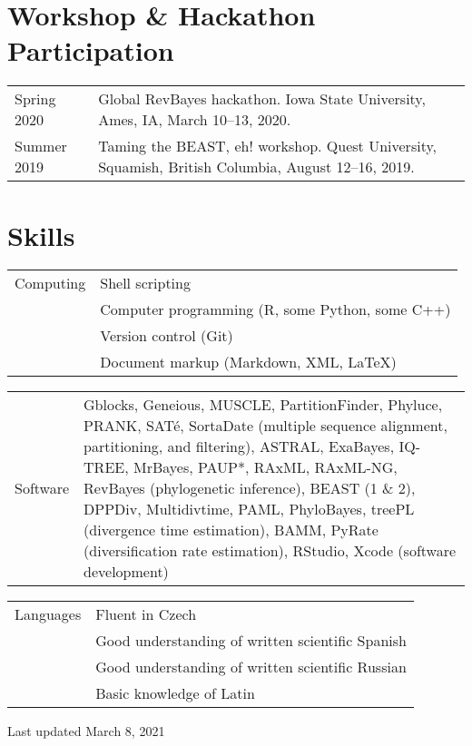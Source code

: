 \documentclass[10pt]{article}
\begin{document}
\section*{Workshop \& Hackathon Participation}

\begin{tabularx}{\textwidth}{>{\raggedleft\arraybackslash}p{2.2cm} X}
Spring 2020 & Global \textsf{RevBayes} hackathon. Iowa State University, Ames, IA, March 10--13, 2020. \\[0.1cm]
Summer 2019 & Taming the BEAST, eh! workshop. Quest University, Squamish, British Columbia, August 12--16, 2019.
\end{tabularx}

\section*{Skills}

\begin{tabularx}{\textwidth}{>{\raggedleft\arraybackslash}p{2.2cm} X}
Computing & Shell scripting \\
& Computer programming (\textsf{R}, some \textsf{Python}, some \textsf{C++}) \\
& Version control (\textsf{Git}) \\
& Document markup (Markdown, XML, \LaTeX)
\end{tabularx}
\begin{tabularx}{\textwidth}{>{\raggedleft\arraybackslash}p{2.2cm} X}
Software & \textsf{Gblocks}, \textsf{Geneious}, \textsf{MUSCLE},  \textsf{PartitionFinder}, \textsf{Phyluce}, \textsf{PRANK}, \textsf{SAT\'{e}}, \textsf{SortaDate} (multiple sequence alignment, partitioning, and filtering), \textsf{ASTRAL}, \textsf{ExaBayes}, \textsf{IQ-TREE}, \textsf{MrBayes}, \textsf{PAUP*}, \textsf{RAxML}, \textsf{RAxML-NG}, \textsf{RevBayes} (phylogenetic inference), \textsf{BEAST (1 \& 2)}, \textsf{DPPDiv}, \textsf{Multidivtime}, \textsf{PAML}, \textsf{PhyloBayes}, \textsf{treePL} (divergence time estimation), \textsf{BAMM}, \textsf{PyRate} (diversification rate estimation), \textsf{RStudio}, \textsf{Xcode} (software development)
\end{tabularx}
\begin{tabularx}{\textwidth}{>{\raggedleft\arraybackslash}p{2.2cm} X}
Languages & Fluent in Czech \\
& Good understanding of written scientific Spanish \\
& Good understanding of written scientific Russian \\
& Basic knowledge of Latin
\end{tabularx}

\vspace*{1cm}

\begin{center}
Last updated March 8, 2021
\end{center}
\end{document}
